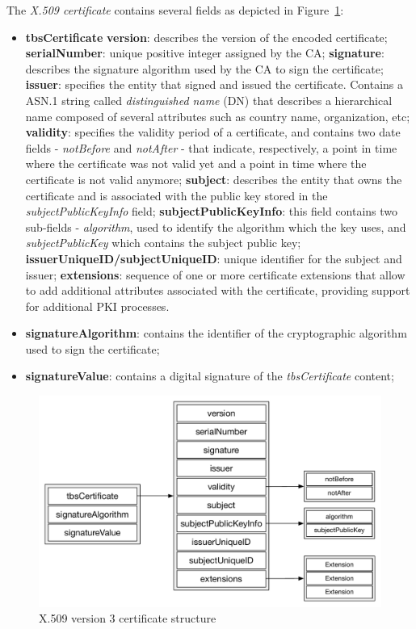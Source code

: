 The \textit{X.509 certificate} contains several fields as depicted in Figure~\ref{fig:x509-certificate}:

\begin{itemize}
	\item \textbf{tbsCertificate}
		\subitem \textbf{version}: describes the version of the encoded certificate;
		\subitem \textbf{serialNumber}: unique positive integer assigned by the \ac{CA};
		\subitem \textbf{signature}: describes the signature algorithm used by the \ac{CA} to sign the certificate;
		\subitem \textbf{issuer}: specifies the entity that signed and issued the certificate. Contains a ASN.1 string called \textit{distinguished name} (DN) that describes a hierarchical name composed of several attributes such as country name, organization, etc;
		\subitem \textbf{validity}: specifies the validity period of a certificate, and contains two date fields - \textit{notBefore} and \textit{notAfter} - that indicate, respectively, a point in time where the certificate was not valid yet and a point in time where the certificate is not valid anymore;
		\subitem \textbf{subject}: describes the entity that owns the certificate and is associated with the public key stored in the \textit{subjectPublicKeyInfo} field;
		\subitem \textbf{subjectPublicKeyInfo}: this field contains two sub-fields - \textit{algorithm}, used to identify the algorithm which the key uses, and \textit{subjectPublicKey} which contains the subject public key;
		\subitem \textbf{issuerUniqueID/subjectUniqueID}: unique identifier for the subject and issuer;
		\subitem \textbf{extensions}: sequence of one or more certificate extensions that allow to add additional attributes associated with the certificate, providing support for additional \ac{PKI} processes.
	\item \textbf{signatureAlgorithm}: contains the identifier of the cryptographic algorithm used to sign the certificate;
	\item \textbf{signatureValue}: contains a digital signature of the \textit{tbsCertificate} content;
\end{itemize}

\begin{figure}[H]
  \centering
  \includegraphics[scale=0.5]{Figures/x509-certificate.pdf}
    \caption{X.509 version 3 certificate structure}
    \label{fig:x509-certificate}
\end{figure}

